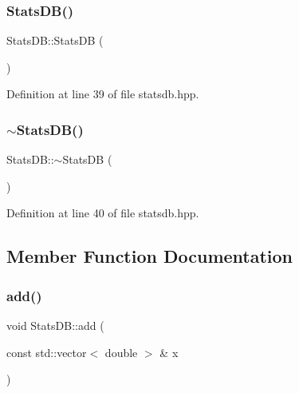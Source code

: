\subsubsection{\texorpdfstring{Stats\+D\+B()}{StatsDB()}}
{\footnotesize\ttfamily Stats\+D\+B\+::\+Stats\+DB (\begin{DoxyParamCaption}{ }\end{DoxyParamCaption})\hspace{0.3cm}{\ttfamily [inline]}}



Definition at line 39 of file statsdb.\+hpp.

\mbox{\label{class_stats_d_b_ab4a9371d706b7418df5cb44e81fb5429}} 
\subsubsection{\texorpdfstring{$\sim$\+Stats\+D\+B()}{~StatsDB()}}
{\footnotesize\ttfamily Stats\+D\+B\+::$\sim$\+Stats\+DB (\begin{DoxyParamCaption}{ }\end{DoxyParamCaption})\hspace{0.3cm}{\ttfamily [inline]}}



Definition at line 40 of file statsdb.\+hpp.



\subsection{Member Function Documentation}
\mbox{\label{class_stats_d_b_a5759e17b759fcafeec7601188aaa8266}} 
\subsubsection{\texorpdfstring{add()}{add()}}
{\footnotesize\ttfamily void Stats\+D\+B\+::add (\begin{DoxyParamCaption}\item[{const std\+::vector$<$ double $>$ \&}]{x }\end{DoxyParamCaption})\hspace{0.3cm}{\ttfamily [inline]}}



